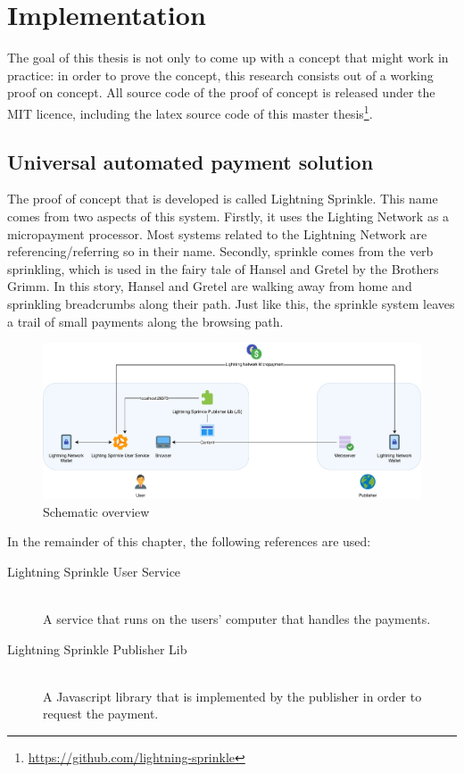 \chapter{Implementation}
\label{cha:implementation}

The goal of this thesis is not only to come up with a concept that might work in practice: in order to prove the concept, this research consists out of a working proof on concept. All source code of the proof of concept is released under the MIT licence, including the latex source code of this master thesis\footnote{\url{https://github.com/lightning-sprinkle}}.

\section{Universal automated payment solution}
The proof of concept that is developed is called Lightning Sprinkle. This name comes from two aspects of this system. Firstly, it uses the Lighting Network as a micropayment processor. Most systems related to the Lightning Network are referencing/referring so in their name. Secondly, sprinkle comes from the verb sprinkling, which is used in the fairy tale of Hansel and Gretel by the Brothers Grimm. In this story, Hansel and Gretel are walking away from home and sprinkling breadcrumbs along their path. Just like this, the sprinkle system leaves a trail of small payments along the browsing path.
\begin{figure}[h!]
  \includegraphics[width=\textwidth]{images/implementation.pdf}
  \caption{Schematic overview}
\end{figure}
In the remainder of this chapter, the following references are used:

\begin{description}
  \item[Lightning Sprinkle User Service] \hfill \\ A service that runs on the users' computer that handles the payments.
  \item[Lightning Sprinkle Publisher Lib] \hfill \\ A Javascript library that is implemented by the publisher in order to request the payment.
\end{description} 

